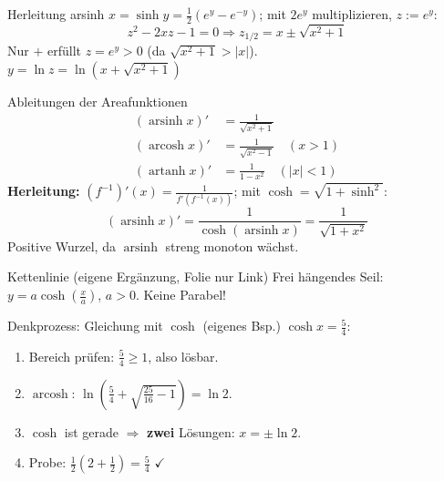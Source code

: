 \documentclass[a4paper, fontsize=7pt]{scrartcl}
\begin{document}
\begin{subbox}{Herleitung arsinh}
$x = \sinh y = \frac{1}{2}\left(e^{y} - e^{-y}\right)$; mit $2e^{y}$
multiplizieren, $z := e^{y}$:
$$z^2 - 2xz - 1 = 0 \Rightarrow z_{1/2} = x \pm \sqrt{x^2 + 1}$$
Nur $+$ erfüllt $z = e^{y} > 0$ (da $\sqrt{x^2 + 1} > |x|$).\\
$y = \ln z = \ln\left(x + \sqrt{x^2 + 1}\right)$
\end{subbox}

\begin{mainbox}{Ableitungen der Areafunktionen}
\begin{align*}
(\operatorname{arsinh} x)' &= \frac{1}{\sqrt{x^2 + 1}}\\
(\operatorname{arcosh} x)' &= \frac{1}{\sqrt{x^2 - 1}}\quad (x > 1)\\
(\operatorname{artanh} x)' &= \frac{1}{1 - x^2}\quad (|x| < 1)
\end{align*}
\textbf{Herleitung:} $(f^{-1})'(x) = \frac{1}{f'(f^{-1}(x))}$; mit
$\cosh = \sqrt{1 + \sinh^2}$:
$$(\operatorname{arsinh} x)' = \frac{1}{\cosh(\operatorname{arsinh} x)}
= \frac{1}{\sqrt{1 + x^2}}$$
Positive Wurzel, da $\operatorname{arsinh}$ streng monoton wächst.
\end{mainbox}

\begin{subbox}{Kettenlinie (eigene Ergänzung, Folie nur Link)}
Frei hängendes Seil: $y = a \cosh\left(\frac{x}{a}\right)$, $a > 0$.
Keine Parabel!
\end{subbox}

\begin{subbox}{Denkprozess: Gleichung mit $\cosh$ (eigenes Bsp.)}
$\cosh x = \frac{5}{4}$:
\begin{enumerate}
    \item Bereich prüfen: $\frac{5}{4} \ge 1$, also lösbar.
    \item $\operatorname{arcosh}$:
          $\ln\left(\frac{5}{4} + \sqrt{\frac{25}{16} - 1}\right) = \ln 2$.
    \item $\cosh$ ist gerade $\Rightarrow$ \textbf{zwei} Lösungen: $x = \pm\ln 2$.
    \item Probe: $\frac{1}{2}\left(2 + \frac{1}{2}\right) = \frac{5}{4}$ $\checkmark$
\end{enumerate}
\end{subbox}
\end{document}
